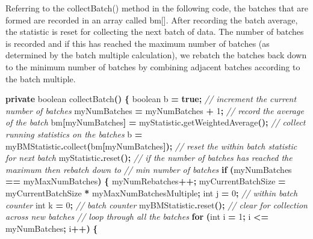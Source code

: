 \documentclass[
]{book}
\newenvironment{Shaded}{\begin{snugshade}}{\end{snugshade}}
\newcommand{\CommentTok}[1]{\textcolor[rgb]{0.56,0.35,0.01}{\textit{#1}}}
\newcommand{\ControlFlowTok}[1]{\textcolor[rgb]{0.13,0.29,0.53}{\textbf{#1}}}
\newcommand{\DataTypeTok}[1]{\textcolor[rgb]{0.13,0.29,0.53}{#1}}
\newcommand{\DecValTok}[1]{\textcolor[rgb]{0.00,0.00,0.81}{#1}}
\newcommand{\FunctionTok}[1]{\textcolor[rgb]{0.00,0.00,0.00}{#1}}
\newcommand{\KeywordTok}[1]{\textcolor[rgb]{0.13,0.29,0.53}{\textbf{#1}}}
\newcommand{\NormalTok}[1]{#1}
\newcommand{\OperatorTok}[1]{\textcolor[rgb]{0.81,0.36,0.00}{\textbf{#1}}}
\theoremstyle{definition}
\theoremstyle{definition}
\theoremstyle{definition}
\theoremstyle{definition}
\theoremstyle{remark}
\begin{document}
Referring to the collectBatch() method in the following code, the batches that are formed are recorded in an array called bm{[}{]}. After recording the batch average, the statistic is reset for collecting the next batch of data. The number of batches is recorded and if this has reached the maximum number of batches (as determined by the batch multiple calculation), we rebatch the batches back down to the minimum number of batches by combining adjacent batches according to the batch multiple.

\begin{Shaded}
\begin{Highlighting}[]
\KeywordTok{private} \DataTypeTok{boolean} \FunctionTok{collectBatch}\OperatorTok{()} \OperatorTok{\{}
    \DataTypeTok{boolean}\NormalTok{ b }\OperatorTok{=} \KeywordTok{true}\OperatorTok{;}
    \CommentTok{// increment the current number of batches}
\NormalTok{    myNumBatches }\OperatorTok{=}\NormalTok{ myNumBatches }\OperatorTok{+} \DecValTok{1}\OperatorTok{;}
    \CommentTok{// record the average of the batch}
\NormalTok{    bm}\OperatorTok{[}\NormalTok{myNumBatches}\OperatorTok{]} \OperatorTok{=}\NormalTok{ myStatistic}\OperatorTok{.}\FunctionTok{getWeightedAverage}\OperatorTok{();}
    \CommentTok{// collect running statistics on the batches}
\NormalTok{    b }\OperatorTok{=}\NormalTok{ myBMStatistic}\OperatorTok{.}\FunctionTok{collect}\OperatorTok{(}\NormalTok{bm}\OperatorTok{[}\NormalTok{myNumBatches}\OperatorTok{]);}
    \CommentTok{// reset the within batch statistic for next batch}
\NormalTok{    myStatistic}\OperatorTok{.}\FunctionTok{reset}\OperatorTok{();}
    \CommentTok{// if the number of batches has reached the maximum then rebatch down to}
    \CommentTok{// min number of batches}
    \ControlFlowTok{if} \OperatorTok{(}\NormalTok{myNumBatches }\OperatorTok{==}\NormalTok{ myMaxNumBatches}\OperatorTok{)} \OperatorTok{\{}
\NormalTok{        myNumRebatches}\OperatorTok{++;}
\NormalTok{        myCurrentBatchSize }\OperatorTok{=}\NormalTok{ myCurrentBatchSize }\OperatorTok{*}\NormalTok{ myMaxNumBatchesMultiple}\OperatorTok{;}
        \DataTypeTok{int}\NormalTok{ j }\OperatorTok{=} \DecValTok{0}\OperatorTok{;} \CommentTok{// within batch counter}
        \DataTypeTok{int}\NormalTok{ k }\OperatorTok{=} \DecValTok{0}\OperatorTok{;} \CommentTok{// batch counter}
\NormalTok{        myBMStatistic}\OperatorTok{.}\FunctionTok{reset}\OperatorTok{();} \CommentTok{// clear for collection across new batches}
        \CommentTok{// loop through all the batches}
        \ControlFlowTok{for} \OperatorTok{(}\DataTypeTok{int}\NormalTok{ i }\OperatorTok{=} \DecValTok{1}\OperatorTok{;}\NormalTok{ i }\OperatorTok{\textless{}=}\NormalTok{ myNumBatches}\OperatorTok{;}\NormalTok{ i}\OperatorTok{++)} \OperatorTok{\{}

\end{Highlighting}
\end{Shaded}
\end{document}

